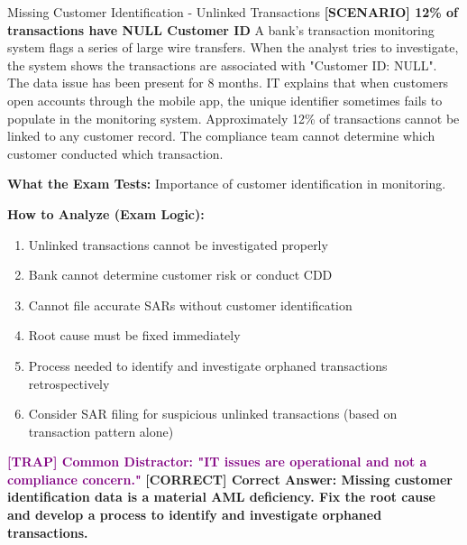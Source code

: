 \documentclass[11pt,a4paper]{beamer}
\newcommand{\trap}[1]{\textcolor{purple}{\textbf{[TRAP] #1}}}
\newcommand{\correct}[1]{\textcolor{green!50!black}{\textbf{[CORRECT] #1}}}
\newcommand{\scenario}[1]{\textcolor{blue!70!black}{\textbf{[SCENARIO] #1}}}
\begin{document}
\begin{frame}{Missing Customer Identification - Unlinked Transactions}
	\scenario{12\% of transactions have NULL Customer ID}
	A bank's transaction monitoring system flags a series of large wire transfers. When the analyst tries to investigate, the system shows the transactions are associated with "Customer ID: NULL". The data issue has been present for 8 months. IT explains that when customers open accounts through the mobile app, the unique identifier sometimes fails to populate in the monitoring system. Approximately 12\% of transactions cannot be linked to any customer record. The compliance team cannot determine which customer conducted which transaction.
	
	\vspace{0.1cm}
	\textbf{What the Exam Tests:} Importance of customer identification in monitoring.
	
	\vspace{0.1cm}
	\textbf{How to Analyze (Exam Logic):}
	\begin{enumerate}
		\item Unlinked transactions cannot be investigated properly
		\item Bank cannot determine customer risk or conduct CDD
		\item Cannot file accurate SARs without customer identification
		\item Root cause must be fixed immediately
		\item Process needed to identify and investigate orphaned transactions retrospectively
		\item Consider SAR filing for suspicious unlinked transactions (based on transaction pattern alone)
	\end{enumerate}
	
	\trap{Common Distractor: "IT issues are operational and not a compliance concern."}
	\correct{Correct Answer: Missing customer identification data is a material AML deficiency. Fix the root cause and develop a process to identify and investigate orphaned transactions.}
\end{frame}
\end{document}
